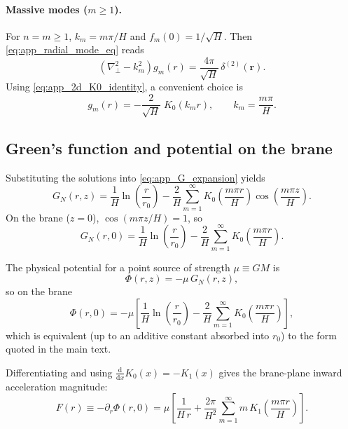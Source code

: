\documentclass[11pt]{article}
\newcommand{\dd}{\mathrm{d}}
\begin{document}
\paragraph{Massive modes ($m\ge 1$).}
For $n=m\ge 1$, $k_m=m\pi/H$ and $f_m(0)=1/\sqrt{H}$.  Then \eqref{eq:app_radial_mode_eq} reads
\begin{equation}
  \left(\nabla_\perp^2 - k_m^2\right)g_m(r)=\frac{4\pi}{\sqrt{H}}\,\delta^{(2)}(\mathbf{r}).
\end{equation}
Using \eqref{eq:app_2d_K0_identity}, a convenient choice is
\begin{equation}
  g_m(r) = -\frac{2}{\sqrt{H}}\;K_0(k_m r),
  \qquad k_m=\frac{m\pi}{H}.
\end{equation}

\subsection{Green's function and potential on the brane}

Substituting the solutions into \eqref{eq:app_G_expansion} yields
\begin{equation}
  G_N(r,z)
  =
  \frac{1}{H}\ln\!\left(\frac{r}{r_0}\right)
  -\frac{2}{H}\sum_{m=1}^{\infty}
  K_0\!\left(\frac{m\pi r}{H}\right)\cos\!\left(\frac{m\pi z}{H}\right).
  \label{eq:app_G_closed}
\end{equation}
On the brane ($z=0$), $\cos(m\pi z/H)=1$, so
\begin{equation}
  G_N(r,0)
  =
  \frac{1}{H}\ln\!\left(\frac{r}{r_0}\right)
  -\frac{2}{H}\sum_{m=1}^{\infty}
  K_0\!\left(\frac{m\pi r}{H}\right).
  \label{eq:app_G_brane}
\end{equation}

The physical potential for a point source of strength $\mu\equiv GM$ is
\begin{equation}
  \Phi(r,z)=-\mu\,G_N(r,z),
\end{equation}
so on the brane
\begin{equation}
  \Phi(r,0)
  =
  -\mu\left[
    \frac{1}{H}\ln\!\left(\frac{r}{r_0}\right)
    -\frac{2}{H}\sum_{m=1}^{\infty}
    K_0\!\left(\frac{m\pi r}{H}\right)
  \right],
\end{equation}
which is equivalent (up to an additive constant absorbed into $r_0$) to the form quoted in the main
text.

Differentiating and using $\frac{\dd}{\dd x}K_0(x)=-K_1(x)$ gives the brane-plane inward acceleration
magnitude:
\begin{equation}
  F(r)\equiv -\partial_r\Phi(r,0)
  =
  \mu\left[
    \frac{1}{H\,r}
    +\frac{2\pi}{H^2}\sum_{m=1}^{\infty}
    m\,K_1\!\left(\frac{m\pi r}{H}\right)
  \right].
  \label{eq:app_F_modes}
\end{equation}
\end{document}
